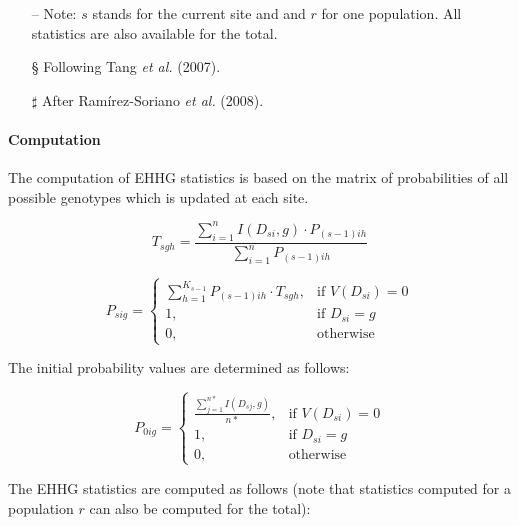 \documentclass{scrartcl}
\begin{document}
\begin{itemize}
    \item[--] Note: $s$ stands for the current site and and $r$ for one
        population. All statistics are also available for the total.
    \item[\S] Following Tang \textit{et al.} (2007).
    \item[$\sharp$] After Ram\'irez-Soriano \textit{et al.} (2008).
\end{itemize}

\paragraph{Computation}

The computation of EHHG statistics is based on the matrix of
probabilities of all possible genotypes which is updated at each site.

\begin{displaymath}
    T_{sgh} = \frac{\sum_{i=1}^n{I(D_{si},g) \cdot P_{(s-1)ih}}} {\sum_{i=1}^n{P_{(s-1)ih}}}
\end{displaymath}

\begin{displaymath}
    P_{sig} = \begin{cases}
        \sum_{h=1}^{K_{s-1}}P_{(s-1)ih} \cdot T_{sgh},  & \text{if } V(D_{si}) = 0 \\
        1,                                              & \text{if } D_{si} = g    \\
        0,                                              & \text{otherwise}
    \end{cases}
\end{displaymath}

The initial probability values are determined as follows:

\begin{displaymath}
    P_{0ig} = \begin{cases}
        \frac{\sum_{j=1}^{n*}{I(D_{sj},g)}}{n*},   & \text{if } V(D_{si}) = 0 \\
        1,                                        & \text{if }D_{si} = g      \\
        0,                                        & \text{otherwise}
    \end{cases}
\end{displaymath}

The EHHG statistics are computed as follows (note that statistics
computed for a population $r$ can also be computed for the total):
\end{document}

